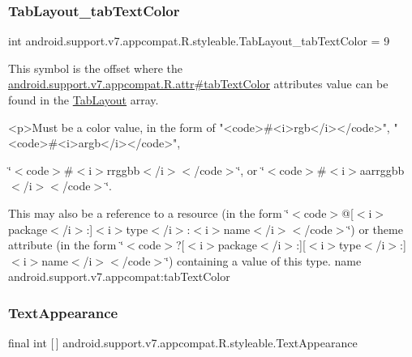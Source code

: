 \subsubsection{\texorpdfstring{Tab\+Layout\+\_\+tab\+Text\+Color}{TabLayout\_tabTextColor}}
{\footnotesize\ttfamily int android.\+support.\+v7.\+appcompat.\+R.\+styleable.\+Tab\+Layout\+\_\+tab\+Text\+Color = 9\hspace{0.3cm}{\ttfamily [static]}}

This symbol is the offset where the \hyperlink{classandroid_1_1support_1_1v7_1_1appcompat_1_1R_1_1attr_a149b5c83b059d57ad457eeafb2767bef}{android.\+support.\+v7.\+appcompat.\+R.\+attr\#tab\+Text\+Color} attribute\textquotesingle{}s value can be found in the \hyperlink{classandroid_1_1support_1_1v7_1_1appcompat_1_1R_1_1styleable_a3c85d0c4cebbccf5b1a16ecfe13938ca}{Tab\+Layout} array.

\begin{DoxyVerb}      <p>Must be a color value, in the form of "<code>#<i>rgb</i></code>", "<code>#<i>argb</i></code>",
\end{DoxyVerb}
 \char`\"{}$<$code$>$\#$<$i$>$rrggbb$<$/i$>$$<$/code$>$\char`\"{}, or \char`\"{}$<$code$>$\#$<$i$>$aarrggbb$<$/i$>$$<$/code$>$\char`\"{}. 

This may also be a reference to a resource (in the form \char`\"{}$<$code$>$@\mbox{[}$<$i$>$package$<$/i$>$\+:\mbox{]}$<$i$>$type$<$/i$>$\+:$<$i$>$name$<$/i$>$$<$/code$>$\char`\"{}) or theme attribute (in the form \char`\"{}$<$code$>$?\mbox{[}$<$i$>$package$<$/i$>$\+:\mbox{]}\mbox{[}$<$i$>$type$<$/i$>$\+:\mbox{]}$<$i$>$name$<$/i$>$$<$/code$>$\char`\"{}) containing a value of this type.  name android.\+support.\+v7.\+appcompat\+:tab\+Text\+Color \mbox{\label{classandroid_1_1support_1_1v7_1_1appcompat_1_1R_1_1styleable_a85d64ca373dd3c60f50e0e9c1a55a8da}} 
\subsubsection{\texorpdfstring{Text\+Appearance}{TextAppearance}}
{\footnotesize\ttfamily final int \mbox{[}$\,$\mbox{]} android.\+support.\+v7.\+appcompat.\+R.\+styleable.\+Text\+Appearance\hspace{0.3cm}{\ttfamily [static]}}

